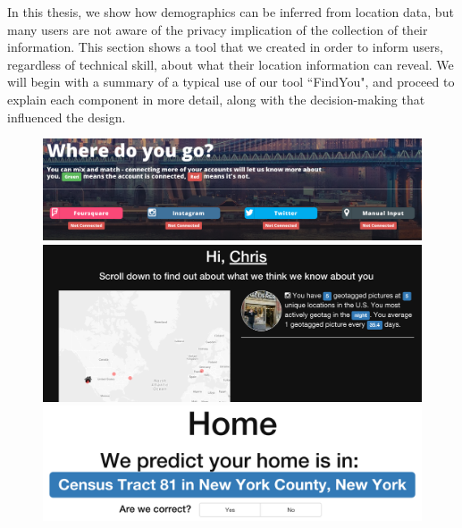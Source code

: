 In this thesis, we show how demographics can be inferred from location data, but many users are not aware of the privacy implication of the collection of their information.
This section shows a tool that we created in order to inform users, regardless of technical skill, about what their location information can reveal. 
We will begin with a summary of a typical use of our tool ``FindYou", and proceed to explain each component in more detail, along with the decision-making that influenced the design. 

\begin{figure}
  \centering
  \includegraphics[width=\linewidth]{fig/findyou/connection.png}

  \includegraphics[width=\linewidth]{fig/findyou/overview.png}

  \includegraphics[width=\linewidth]{fig/findyou/home.png}


\end{figure}

